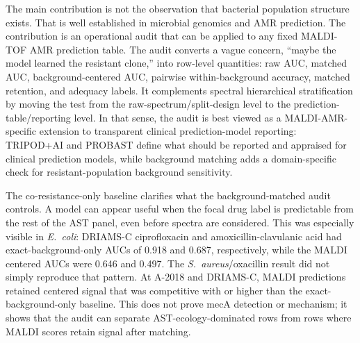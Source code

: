 \documentclass[11pt]{article}
\begin{document}
The main contribution is not the observation that bacterial population structure exists. That is well established in microbial genomics and AMR prediction\cite{yu2025population}. The contribution is an operational audit that can be applied to any fixed MALDI-TOF AMR prediction table. The audit converts a vague concern, ``maybe the model learned the resistant clone,'' into row-level quantities: raw AUC, matched AUC, background-centered AUC, pairwise within-background accuracy, matched retention, and adequacy labels. It complements spectral hierarchical stratification by moving the test from the raw-spectrum/split-design level to the prediction-table/reporting level\cite{weis2022stratification}. In that sense, the audit is best viewed as a MALDI-AMR-specific extension to transparent clinical prediction-model reporting: TRIPOD+AI and PROBAST define what should be reported and appraised for clinical prediction models, while background matching adds a domain-specific check for resistant-population background sensitivity\cite{collins2024tripodai,wolff2019probast}.

The co-resistance-only baseline clarifies what the background-matched audit controls. A model can appear useful when the focal drug label is predictable from the rest of the AST panel, even before spectra are considered. This was especially visible in \textit{E.~coli}: DRIAMS-C ciprofloxacin and amoxicillin-clavulanic acid had exact-background-only AUCs of 0.918 and 0.687, respectively, while the MALDI centered AUCs were 0.646 and 0.497. The \textit{S.~aureus}/oxacillin result did not simply reproduce that pattern. At A-2018 and DRIAMS-C, MALDI predictions retained centered signal that was competitive with or higher than the exact-background-only baseline. This does not prove mecA detection or mechanism; it shows that the audit can separate AST-ecology-dominated rows from rows where MALDI scores retain signal after matching.
\end{document}
